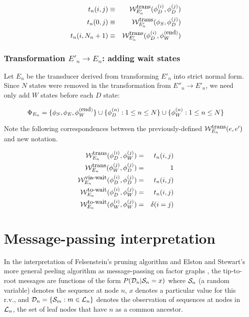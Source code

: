 \documentclass{article}
\newcommand\States{\Phi}
\newcommand\statesof[1]{\States_{#1}}
\newcommand\startstate{\phi_S}
\newcommand\laststate{\phi_E}
\newcommand\weight{{\cal W}}
\newcommand\weightfunof[1]{\weight_{#1}}
\newcommand\transweightfun[1]{\weightfunof{#1}^{\mbox{\small trans}}}
\newcommand\transviawait[1]{\weightfunof{#1}^{\mbox{\small via-wait}}}
\newcommand\transtowait[1]{\weightfunof{#1}^{\mbox{\small to-wait}}}
\newcommand\leaves{{\cal L}}
\newcommand\outputs{{\cal D}}
\newcommand\outputn[1]{{\cal S}_{#1}}
\newcommand\newTransName[1]{t_{#1}}
\newcommand\numStates[1]{N_{#1}}
\newcommand\profiledelete[1]{\phi_D^{(#1)}}
\newcommand\profilewait[1]{\phi_W^{(#1)}}
\newcommand\profileterminate{\profilewait{\mbox{\small end}}}
\begin{document}
\begin{eqnarray*}
\newTransName{n}(i,j) & \equiv & \transweightfun{E'_n}(\profiledelete{i},\profiledelete{j}) \\
\newTransName{n}(0,j) & \equiv & \transweightfun{E'_n}(\startstate,\profiledelete{j})  \\
\newTransName{n}(i,\numStates{n}+1) & \equiv & \transweightfun{E'_n}(\profiledelete{i}, \profileterminate)  \\
\end{eqnarray*}




\subsubsection{Transformation $E'_n \to E_n$: adding wait states}

Let $E_n$ be the transducer derived from transforming $E'_n$ into strict normal form.  Since $N$ states were removed in the transformation from $E''_n \rightarrow E'_n$, we need only add $W$ states before each $D$ state:

\[
\statesof{E_n} = \{ \startstate, \laststate , \profileterminate \} \cup  \{\profiledelete{n} : 1 \leq n \leq N \}
\cup  \{\profilewait{n} : 1 \leq n \leq N \}
\]

Note the following correspondences between the previously-defined  $\transweightfun{E_n}(e,e')$ and new notation. 

\begin{eqnarray*}
\transweightfun{E_n}(\profiledelete{i},\profilewait{j}) & = & \newTransName{n}(i,j) \\
\transweightfun{E_n}(\profilewait{j},\profiledelete{j}) & = & 1 \\
\transviawait{E_n}(\profiledelete{i},\profiledelete{j}) & = & \newTransName{n}(i,j) \\
\transtowait{E_n}(\profiledelete{i},\profilewait{j}) & = & \newTransName{n}(i,j) \\
\transtowait{E_n}(\profilewait{i},\profilewait{j}) & = & \delta(i=j) \\
\end{eqnarray*}

\section{Message-passing interpretation}

In the interpretation of Felsenstein's pruning algorithm \cite{Felsenstein81} and Elston and Stewart's more general peeling algorithm \cite{ElstonStewart71} as message-passing on factor graphs \cite{KschischangEtAl98},
the tip-to-root messages are functions of the form
$P(\outputs_n|\outputn{n}=x)$ where $\outputn{n}$ (a random variable) denotes the sequence at node $n$,
$x$ denotes a particular value for this r.v.,
and
$\outputs_n = \{ \outputn{m} : m \in \leaves_n \}$
denotes the observation of sequences at nodes in $\leaves_n$, the set of leaf nodes that have $n$ as a common ancestor.
\end{document}
